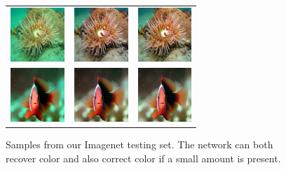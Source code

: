 \documentclass[letterpaper, 10pt, conference]{ieeeconf}
\begin{document}
\begin{figure}
\begin{tabular}{p{1.7cm} p{1.7cm} p{1.7cm}}
   \includegraphics[width=0.8in]{n01914609_1607_real} &
   \includegraphics[width=0.8in]{n01914609_1607_gen_0} &
   \includegraphics[width=0.8in]{n01914609_1607_gen_1} \\

   \includegraphics[width=0.8in]{n02607072_6241_real} &
   \includegraphics[width=0.8in]{n02607072_6241_gen_0} &
   \includegraphics[width=0.8in]{n02607072_6241_gen_1} \\

\end{tabular}
\caption{Samples from our Imagenet testing set. The network can both recover color and also correct color if a small amount is present.}
\end{figure}

\end{document}

